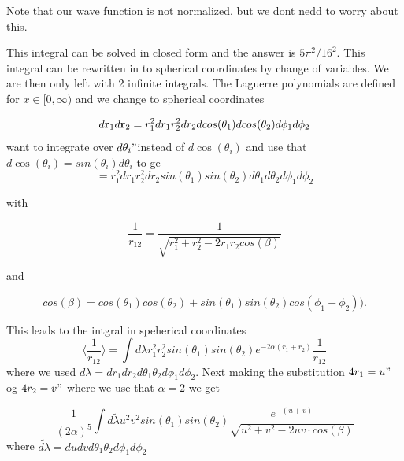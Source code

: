 \documentclass[twoside,twocolumn]{article}
\begin{document}
Note that our wave function is not normalized, but we dont nedd to worry about this.

This integral can be solved in closed form and the answer is
$5\pi^2/16^2$.
This integral can be rewritten in to spherical coordinates by change of variables. We are then only left with 2 infinite integrals. The Laguerre
polynomials are defined for $x\in [0,\infty)$ and we change to
spherical coordinates

\[
   d{\bf r}_1d{\bf r}_2  = r_1^2dr_1 r_2^2dr_2 dcos(\theta_1)dcos(\theta_2)d\phi_1d\phi_2 
\]
want to integrate over $d\theta_i" $instead of $d\cos(\theta_i)$ and use that $d\cos(\theta_i) = sin(\theta_i)d\theta_i$ to ge
\[
= r_1^2dr_1 r_2^2dr_2 sin(\theta_1)sin(\theta_2)d\theta_1d\theta_2d\phi_1d\phi_2
\]

with

\[
   \frac{1}{r_{12}}= \frac{1}{\sqrt{r_1^2+r_2^2-2r_1r_2cos(\beta)}}
\]

and 

\[
cos(\beta) = cos(\theta_1)cos(\theta_2)+sin(\theta_1)sin(\theta_2)cos(\phi_1-\phi_2)).
\]

This leads to the intgral in speherical coordinates
\begin{equation}
	\langle \frac{1}{{r_{12}}} \rangle=\int d\lambda  r_1^2r_2^2sin(\theta_1)sin(\theta_2)e^{-2\alpha (r_1+r_2)}\frac{1}{r_{12}}
\end{equation}
where we used $d\lambda  =dr_1 dr_2d\theta_1\theta_2d\phi_1d\phi_2$. Next making the substitution $4r_1 = u"$ og $4r_2 = v"$ where we use that $\alpha = 2$ we get

\begin{equation}
	\frac{1}{(2\alpha)^5}\int d\tilde{\lambda}  u^2v^2sin(\theta_1)sin(\theta_2)\frac{e^{-(u+v)}}{\sqrt{u^2+v^2-2uv \cdot cos(\beta)}}
\end{equation} 
where  $\tilde{d\lambda}  =du dvd\theta_1\theta_2d\phi_1d\phi_2$

\end{document}
